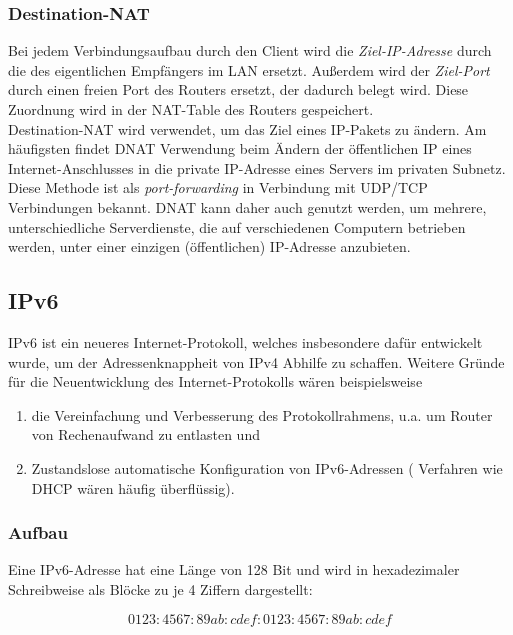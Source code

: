 \documentclass[a4paper, 12pt]{report}
\begin{document}
\begin{multicols}{2}
\subsubsection{Destination-NAT}

Bei jedem Verbindungsaufbau durch den Client wird die \emph{Ziel-IP-Adresse}
durch die des eigentlichen Empfängers im LAN ersetzt. Außerdem wird der
\emph{Ziel-Port} durch einen freien Port des Routers ersetzt, der dadurch
belegt wird. Diese Zuordnung wird in der NAT-Table des Routers gespeichert. \\

Destination-NAT wird verwendet, um das Ziel eines IP-Pakets zu ändern. Am
häufigsten findet DNAT Verwendung beim Ändern der öffentlichen IP eines
Internet-Anschlusses in die private IP-Adresse eines Servers im privaten
Subnetz. Diese Methode ist als \emph{port-forwarding} in Verbindung mit UDP/TCP
Verbindungen bekannt. DNAT kann daher auch genutzt werden, um mehrere,
unterschiedliche Serverdienste, die auf verschiedenen Computern betrieben
werden, unter einer einzigen (öffentlichen) IP-Adresse anzubieten.

\subsection{IPv6}

IPv6 ist ein neueres Internet-Protokoll, welches insbesondere dafür entwickelt
wurde, um der Adressenknappheit von IPv4 Abhilfe zu schaffen. Weitere Gründe
für die Neuentwicklung des Internet-Protokolls wären beispielsweise

\begin{enumerate}
	\item die Vereinfachung und Verbesserung des Protokollrahmens, u.a. um
		Router von Rechenaufwand zu entlasten und
	\item Zustandslose automatische Konfiguration von IPv6-Adressen (
		Verfahren wie DHCP wären häufig überflüssig).
\end{enumerate}

\subsubsection{Aufbau}

Eine IPv6-Adresse hat eine Länge von 128 Bit und wird in hexadezimaler
Schreibweise als Blöcke zu je 4 Ziffern dargestellt:

\begin{equation}
	0123:4567:89ab:cdef:0123:4567:89ab:cdef
\end{equation}


\end{multicols}
\end{document}

